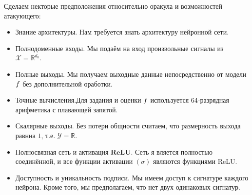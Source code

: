 Сделаем некторые предположения относительно оракула и возможностей атакующего:
\begin{itemize}
\item
	 $\textbf{Знание архитектуры}$. Нам требуется знать архитектуру нейронной сети.
\item
	 $\textbf{Полнодоменные входы}$. Мы подаём на вход произвольные сигналы из $\mathcal X = \mathbb{R}^{d_0}$.
\item
	 $\textbf{Полные выходы}$. Мы получаем выходные данные непосредственно от модели $ \mathnormal{f}$ без дополнительной оработки.
\item
	 $\textbf{Точные вычисления}$.Для задания и оценки $ \mathnormal{f}$ используется $64$-разрядная арифметика с плавающей запятой.
\item
	 $\textbf{Скалярные выходы}$. Без потери общности считаем, что размерность выхода равнна $1$, т.е. $\mathcal Y = \mathbb {R}$.
\item
	 $\textbf{Полносвязная сеть и активация ReLU}$. Сеть я вляется полностью соединённой, и все функции активации $\left ( \sigma \right )$ являются функциями ReLU.
\item
	 $\textbf{Доступность и уникальность подписи}$. Мы имеем доступ к сигнатуре каждого нейрона. Кроме того, мы предполагаем, что нет двух одинаковых сигнатур.

\end{itemize}